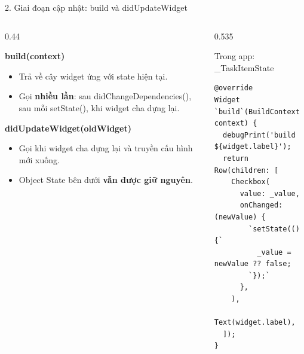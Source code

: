 \documentclass[aspectratio=169,11pt]{beamer}
\newcommand{\ma}[1]{{\ttfamily\small #1}}
\newcommand{\ham}[1]{\par{\color{chinh}\bfseries\ttfamily\small #1}\par\vspace{0.3mm}}
\newcommand{\nhanma}[1]{{\scriptsize\color{xam}#1\par}\vspace{0.8mm}}
\begin{document}
\begin{frame}[fragile]{2. Giai đoạn cập nhật: build và didUpdateWidget}
  \begin{columns}[T,onlytextwidth]
    \begin{column}{0.44\textwidth}
      \small
      \ham{build(context)}
      \begin{itemize}\setlength{\itemsep}{0.3mm}
        \item Trả về cây widget ứng với state hiện tại.
        \item Gọi \textbf{nhiều lần}: sau \ma{didChangeDependencies()}, sau mỗi
              \ma{setState()}, khi widget cha dựng lại.
      \end{itemize}
      \ham{didUpdateWidget(oldWidget)}
      \begin{itemize}\setlength{\itemsep}{0.3mm}
        \item Gọi khi widget cha dựng lại và truyền cấu hình mới xuống.
        \item Object State bên dưới \textbf{vẫn được giữ nguyên}.
      \end{itemize}
    \end{column}
    \begin{column}{0.535\textwidth}
      \nhanma{Trong app: \ma{\scriptsize \_TaskItemState}}
\begin{lstlisting}
@override
Widget `build`(BuildContext context) {
  debugPrint('build ${widget.label}');
  return Row(children: [
    Checkbox(
      value: _value,
      onChanged: (newValue) {
        `setState(() {`
          _value = newValue ?? false;
        `});`
      },
    ),
    Text(widget.label),
  ]);
}
\end{lstlisting}
    \end{column}
  \end{columns}
\end{frame}
\end{document}
